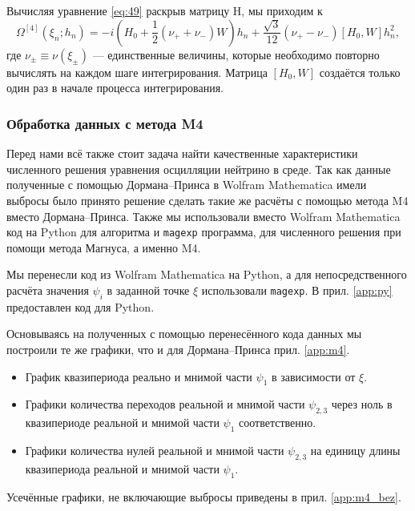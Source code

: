 \documentclass[a4paper,12pt]{article}
\begin{document}
	Вычисляя уравнение \eqref{eq:49} раскрыв матрицу H,  мы приходим к
	\begin{equation}
		\Omega^{[4]}(\xi_n;h_n)=-i(H_0 + \frac{1}{2}(\nu_+ + \nu_-)W)h_n +
\frac{\sqrt{3}}{12}(\nu_+ - \nu_-)[H_0, W]h_n^2,
	\end{equation}
	где \(\nu_{\pm} \equiv \nu(\xi_{\pm})\) --- единственные величины, которые необходимо повторно вычислять на каждом шаге интегрирования. Матрица \([H_0,W]\) создаётся только один раз в начале процесса интегрирования.

\subsubsection{Обработка данных с метода M4}

	Перед нами всё также стоит задача найти качественные характеристики численного решения уравнения осцилляции нейтрино в среде. Так как данные полученные с помощью Дормана--Принса в \textsf{Wolfram Mathematica} имели выбросы было принято решение сделать такие же расчёты с помощью метода M4 вместо Дормана--Принса. Также мы использовали вместо \textsf{Wolfram Mathematica} код на \textsf{Python} для алгоритма и \texttt{magexp} программа, для численного решения при помощи метода Магнуса, а именно M4.

	Мы перенесли код из \textsf{Wolfram Mathematica} на \textsf{Python}, а для непосредственного расчёта значения \(\psi_i\) в заданной точке \(\xi\) использовали \texttt{magexp}. В прил. \ref{app:py} предоставлен код для \textsf{Python}.
	
	Основываясь на полученных с помощью перенесённого кода данных мы построили те же графики, что и для Дормана--Принса прил. \ref{app:m4}.

\begin{itemize}
\item
График квазипериода реально и мнимой части \(\psi_1\) в зависимости от \(\xi\).

\item
Графики количества переходов реальной и мнимой части \(\psi_{2,3}\) через ноль в квазипериоде реальной и мнимой части \(\psi_1\) соответственно.

\item
Графики количества нулей реальной и мнимой части \(\psi_{2,3}\) на единицу длины квазипериода реальной и мнимой части \(\psi_1\).
  \end{itemize}

	Усечённые графики, не включающие выбросы приведены в прил. \ref{app:m4_bez}.
\end{document}
